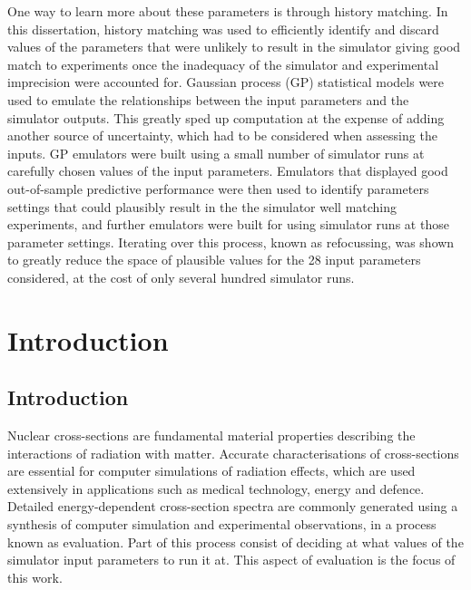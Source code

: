 \documentclass[
  12pt,
  a4paper,
  twoside]{book}
\begin{document}
One way to learn more about these parameters is through history matching. In this dissertation, history matching was used to efficiently identify and discard values of the parameters that were unlikely to result in the simulator giving good match to experiments once the inadequacy of the simulator and experimental imprecision were accounted for. Gaussian process (GP) statistical models were used to emulate the relationships between the input parameters and the simulator outputs. This greatly sped up computation at the expense of adding another source of uncertainty, which had to be considered when assessing the inputs. GP emulators were built using a small number of simulator runs at carefully chosen values of the input parameters. Emulators that displayed good out-of-sample predictive performance were then used to identify parameters settings that could plausibly result in the the simulator well matching experiments, and further emulators were built for using simulator runs at those parameter settings. Iterating over this process, known as refocussing, was shown to greatly reduce the space of plausible values for the 28 input parameters considered, at the cost of only several hundred simulator runs.

\tableofcontents

\fancyhead{}
\fancyfoot{}
\pagestyle{fancy}
\fancyhead[RO,LE]{\thepage}
\fancyhead[LO,RE]{\rightmark}

\newcommand{\studentcomment}[1]{\todo[inline, backgroundcolor=blue!30]{\textsc{Student:} #1}}
\newcommand{\DSWcomment}[1]{\todo[inline, backgroundcolor=green!30]{\textsc{DSW:} #1}}
\newcommand{\supcomment}[1]{\todo[inline, backgroundcolor=red!30]{\textsc{Supervisor:} #1}}

\mainmatter

\hypertarget{Intro}{%
\chapter{Introduction}\label{Intro}}

\hypertarget{introduction}{%
\section{Introduction}\label{introduction}}

Nuclear cross-sections are fundamental material properties describing the interactions of radiation with matter. Accurate characterisations of cross-sections are essential for computer simulations of radiation effects, which are used extensively in applications such as medical technology, energy and defence. Detailed energy-dependent cross-section spectra are commonly generated using a synthesis of computer simulation and experimental observations, in a process known as evaluation. Part of this process consist of deciding at what values of the simulator input parameters to run it at. This aspect of evaluation is the focus of this work.
\end{document}
